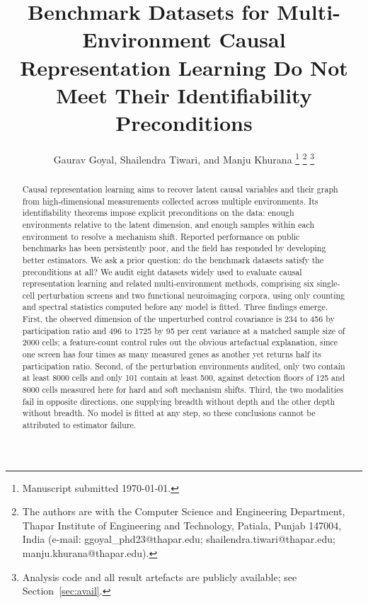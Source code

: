 \documentclass[journal,twoside,web]{ieeecolor}
\begin{document}
\title{Benchmark Datasets for Multi-Environment Causal Representation Learning Do Not Meet Their Identifiability Preconditions}

\author{Gaurav Goyal, Shailendra Tiwari, and Manju Khurana
\thanks{Manuscript submitted \today.}
\thanks{The authors are with the Computer Science and Engineering Department,
Thapar Institute of Engineering and Technology, Patiala, Punjab 147004, India
(e-mail: ggoyal\_phd23@thapar.edu; shailendra.tiwari@thapar.edu;
manju.khurana@thapar.edu).}
\thanks{Analysis code and all result artefacts are publicly available; see
Section~\ref{sec:avail}.}}

\maketitle

\begin{abstract}
Causal representation learning aims to recover latent causal variables and
their graph from high-dimensional measurements collected across multiple
environments. Its identifiability theorems impose explicit preconditions on
the data: enough environments relative to the latent dimension, and enough
samples within each environment to resolve a mechanism shift. Reported
performance on public benchmarks has been persistently poor, and the field has
responded by developing better estimators. We ask a prior question: do the
benchmark datasets satisfy the preconditions at all? We audit eight datasets
widely used to evaluate causal representation learning and related
multi-environment methods, comprising six single-cell perturbation screens and
two functional neuroimaging corpora, using only counting and spectral
statistics computed before any model is fitted. Three findings emerge. First,
the observed dimension of the unperturbed control covariance is 234 to 456 by
participation ratio and 496 to 1725 by 95 per cent variance at a matched
sample size of 2000 cells; a feature-count control rules out the obvious
artefactual explanation, since one screen has four times as many measured
genes as another yet returns half its participation ratio. Second, of the
perturbation environments audited, only two contain at least 8000 cells and
only 101 contain at least 500, against detection floors of 125 and 8000 cells
measured here for hard and soft mechanism shifts. Third, the two modalities
fail in opposite directions, one supplying breadth without depth and the other
depth without breadth. No model is fitted at any step, so these conclusions
cannot be attributed to estimator failure.
\end{abstract}
\end{document}
